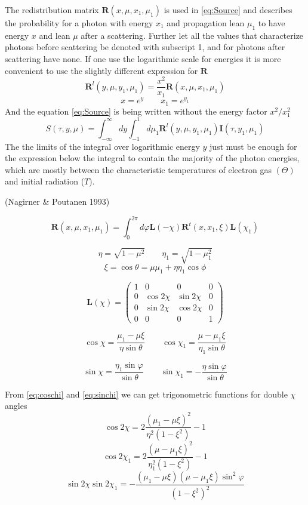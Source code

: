 \documentclass[iop, usenatbib]{emulateapj}
\newcommand{\be}{\begin{equation}}
\newcommand{\ee}{\end{equation}}
\begin{document}
The redistribution matrix $\bm{R}(x,\mu,x_1,\mu_1)$
is used in \eqref{eq:Source} and describes the probability for a photon with energy $x_1$ and propagation lean $\mu_1$ to have energy $x$ 
and lean $\mu$ after a scattering.  
Further let all the values that characterize photons before scattering be denoted with subscript 1,
and for photons after scattering have none. 
If one use the logarithmic scale for energies it is more convenient to use the slightly different expression for $\bm{R}$  
$$
\bm{R}^l(y,\mu,y_1,\mu_1)=\frac{x^2}{x_1}\bm{R}(x,\mu,x_1,\mu_1) $$$$
x=e^y \qquad x_1=e^{y_1}
$$
And the equation \eqref{eq:Source} is being written  without the energy factor $x^2/x_1^2$ 
\be
S(\tau,y,\mu)= \int_{-\infty}^\infty dy \int_{-1}^1 d\mu_1 
\bm{R}^l(y,\mu,y_1,\mu_1)\bm{I}(\tau,y_1,\mu_1)
\ee
The the limits of the integral over logarithmic energy $y$ just must be enough 
for the expression below the integral to contain the majority of the photon energies, which are mostly between the characteristic temperatures of electron gas $(\Theta)$ and initial radiation ($T$).

(Nagirner \& Poutanen 1993)

\be
\bm{R}(x,\mu,x_1,\mu_1)=\int_0^{2\pi}d\varphi 
\bm{L}(-\chi)
\bm{R}^t(x,x_1,\xi)
\bm{L}(\chi_1)
\ee


$$
\eta=\sqrt{1-\mu^2} \qquad \eta_1=\sqrt{1-\mu_1^2}
$$
\be
\xi=\cos\theta=\mu \mu_1 + \eta \eta_1 \cos \phi
\ee

\be
\bm{L}(\chi)=
\left( {\begin{array}{cccc}
    1 & 0 & 0 & 0 \\
    0 & \cos{2\chi} & \sin{2\chi} & 0 \\
    0 & \sin{2\chi} & \cos{2\chi} & 0 \\
    0 & 0 & 0 & 1  
   \end{array} } \right)
\ee

\be\label{eq:coschi}
\cos\chi=\frac{\mu_1-\mu\xi}{\eta\sin\theta}
\qquad
\cos\chi_1=\frac{\mu-\mu_1\xi}{\eta_1\sin\theta}
\ee

\be
\label{eq:sinchi}
\sin\chi=\frac{\eta_1\sin\varphi}{\sin\theta}
\qquad
\sin\chi_1=-\frac{\eta\sin\varphi}{\sin\theta}
\ee

From \eqref{eq:coschi} and \eqref{eq:sinchi} we can get trigonometric functions for double $\chi$ angles
\be
\cos2\chi=2\frac{(\mu_1-\mu\xi)^2}{\eta^2(1-\xi^2)}-1
\ee
\be
\cos2\chi_1=2\frac{(\mu-\mu_1\xi)^2}{\eta_1^2(1-\xi^2)}-1
\ee
\be
\sin2\chi\sin2\chi_1=-
\frac{(\mu_1-\mu\xi)(\mu-\mu_1\xi)\sin^2\varphi}{(1-\xi^2)^2}
\ee
\end{document}
